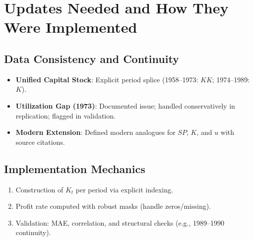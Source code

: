 \documentclass[12pt,a4paper]{article}
\begin{document}

\section{Updates Needed and How They Were Implemented}
\subsection{Data Consistency and Continuity}
\begin{itemize}[leftmargin=1.2em]
    \item \textbf{Unified Capital Stock}: Explicit period splice (1958--1973: \(KK\); 1974--1989: \(K\)).
    \item \textbf{Utilization Gap (1973)}: Documented issue; handled conservatively in replication; flagged in validation.
    \item \textbf{Modern Extension}: Defined modern analogues for \(SP\), \(K\), and \(u\) with source citations.
\end{itemize}

\subsection{Implementation Mechanics}
\begin{enumerate}[leftmargin=1.2em]
    \item Construction of \(K_t\) per period via explicit indexing.
    \item Profit rate computed with robust masks (handle zeros/missing).
    \item Validation: MAE, correlation, and structural checks (e.g., 1989--1990 continuity).
\end{enumerate}
\end{document}
